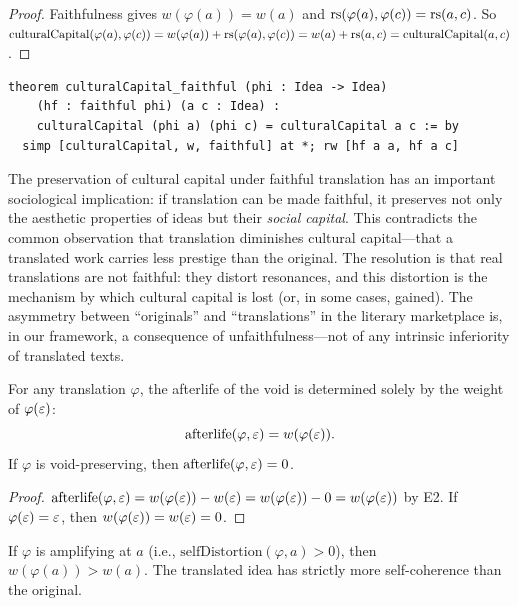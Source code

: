 \begin{proof}
Faithfulness gives $w(\varphi(a)) = w(a)$ and
$\mathrm{rs}(\varphi(a), \varphi(c)) = \mathrm{rs}(a, c)$.  So
$\mathrm{culturalCapital}(\varphi(a), \varphi(c)) =
 w(\varphi(a)) + \mathrm{rs}(\varphi(a), \varphi(c)) = w(a) + \mathrm{rs}(a, c) =
 \mathrm{culturalCapital}(a, c)$.
\end{proof}

\begin{lstlisting}
theorem culturalCapital_faithful (phi : Idea -> Idea)
    (hf : faithful phi) (a c : Idea) :
    culturalCapital (phi a) (phi c) = culturalCapital a c := by
  simp [culturalCapital, w, faithful] at *; rw [hf a a, hf a c]
\end{lstlisting}

\begin{interpretation}
\label{int:capital-faithful}
The preservation of cultural capital under faithful translation has an
important sociological implication: if translation can be made faithful,
it preserves not only the aesthetic properties of ideas but their
\emph{social capital}.  This contradicts the common observation that
translation diminishes cultural capital---that a translated work carries
less prestige than the original.  The resolution is that real translations
are not faithful: they distort resonances, and this distortion is the
mechanism by which cultural capital is lost (or, in some cases, gained).
The asymmetry between ``originals'' and ``translations'' in the literary
marketplace is, in our framework, a consequence of unfaithfulness---not
of any intrinsic inferiority of translated texts.
\end{interpretation}

\begin{theorem}
\label{thm:void-afterlife-zero}
For any translation $\varphi$, the afterlife of the void is determined solely by the weight of $\varphi(\varepsilon)$:
\[
  \mathrm{afterlife}(\varphi, \varepsilon) = w(\varphi(\varepsilon)).
\]
If $\varphi$ is void-preserving, then $\mathrm{afterlife}(\varphi, \varepsilon) = 0$.
\end{theorem}

\begin{proof}
$\mathrm{afterlife}(\varphi, \varepsilon) = w(\varphi(\varepsilon)) - w(\varepsilon) = w(\varphi(\varepsilon)) - 0 = w(\varphi(\varepsilon))$ by E2.  If $\varphi(\varepsilon) = \varepsilon$, then $w(\varphi(\varepsilon)) = w(\varepsilon) = 0$.
\end{proof}

\begin{theorem}
\label{thm:amplifying-increases-weight}
If $\varphi$ is amplifying at $a$ (i.e., $\mathrm{selfDistortion}(\varphi, a) > 0$), then $w(\varphi(a)) > w(a)$.  The translated idea has strictly more self-coherence than the original.
\end{theorem}


